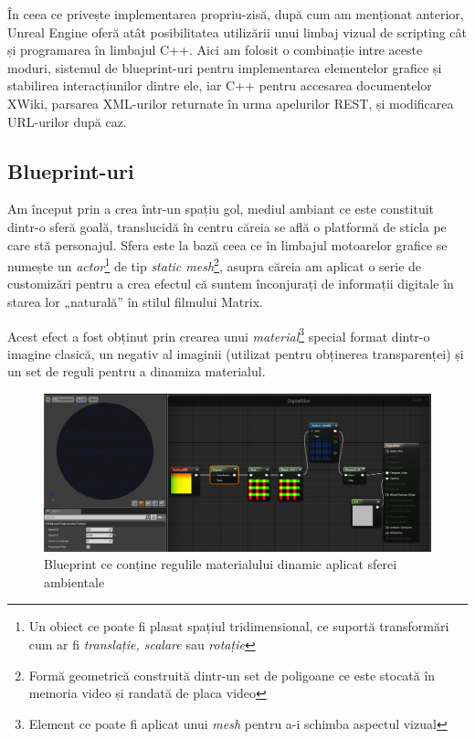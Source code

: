 În ceea ce privește implementarea propriu-zisă, după cum am menționat anterior, Unreal Engine oferă atât posibilitatea utilizării unui limbaj vizual de scripting cât și programarea în limbajul C++.
Aici am folosit o combinație intre aceste moduri, sistemul de blueprint-uri pentru implementarea elementelor grafice și stabilirea interacțiunilor dintre ele, iar C++ pentru accesarea documentelor XWiki, parsarea XML-urilor returnate în urma apelurilor REST, și modificarea URL-urilor după caz.

\subsection{Blueprint-uri}

Am început prin a crea într-un spațiu gol, mediul ambiant ce este constituit dintr-o sferă goală, translucidă în centru căreia se află o platformă de sticla pe care stă personajul.
Sfera este la bază ceea ce în limbajul motoarelor grafice se numește un \textit{actor}\footnote{Un obiect ce poate fi plasat spațiul tridimensional, ce suportă transformări cum ar fi \textit{translație, scalare} sau \textit{rotație}} de tip \textit{static mesh}\footnote{Formă geometrică construită dintr-un set de poligoane ce este stocată în memoria video și randată de placa video}, asupra căreia am aplicat o serie de customizări pentru a crea efectul că suntem înconjurați de informații digitale în starea lor „naturală” în stilul filmului Matrix.

Acest efect a fost obținut prin crearea unui \textit{material}\footnote{Element ce poate fi aplicat unui \textit{mesh} pentru a-i schimba aspectul vizual} special format dintr-o imagine clasică, un negativ al imaginii (utilizat pentru obținerea transparenței) și un set de reguli pentru a dinamiza materialul.

\begin{figure}[h]
  \centering
  \includegraphics[scale=0.33]{img/digitalBlue.png}
  \caption{Blueprint ce conține regulile materialului dinamic aplicat sferei ambientale}
\end{figure}

